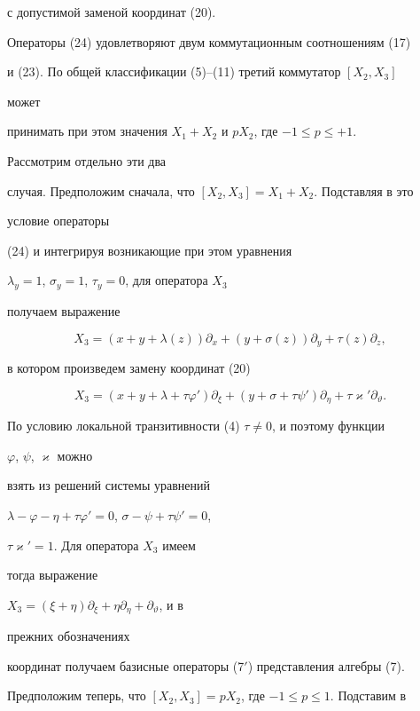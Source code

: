 с допустимой заменой координат (20). 


 


Операторы (24) удовлетворяют двум коммутационным соотношениям (17) 


и (23). По общей классификации (5)--(11) третий коммутатор $[X_2,X_3]$ 


может 


принимать при этом значения $X_1+X_2$ и $pX_2$, где $-1\le p\le +1$. 


Рассмотрим отдельно эти два 


случая. Предположим сначала, что $[X_2,X_3]=X_1+X_2$. Подставляя в это 


условие операторы 


(24) и интегрируя возникающие при этом уравнения 


$\lambda_y=1$, $\sigma_y=1$, $\tau_y=0$, для оператора $X_3$ 


получаем выражение 


$$ 


X_3=(x+y+\lambda(z))\partial_x+(y+\sigma(z))\partial_y+ 


\tau(z)\partial_z, 


$$ 


в котором произведем замену координат (20)


$$ 


X_3=(x+y+\lambda+\tau\varphi')\partial_\xi+ 


(y+\sigma+\tau\psi')\partial_\eta+\tau\varkappa'\partial_\vartheta. 


$$ 


По условию локальной транзитивности (4) $\tau\ne 0$, и поэтому функции 


$\varphi$, $\psi$, $\varkappa$ можно 


взять из решений системы уравнений 


$\lambda-\varphi-\eta+\tau\varphi'=0$, $\sigma-\psi+\tau\psi'=0$, 


$\tau\varkappa'=1$. Для оператора $X_3$ имеем 


тогда выражение 


$X_3=(\xi+\eta)\partial_\xi+\eta\partial_\eta+\partial_\vartheta$, и в 


прежних обозначениях 


координат получаем базисные операторы (7${}'$) представления алгебры (7). 


 


Предположим теперь, что $[X_2,X_3]=pX_2$, где $-1\le p\le 1$. Подставим в 


